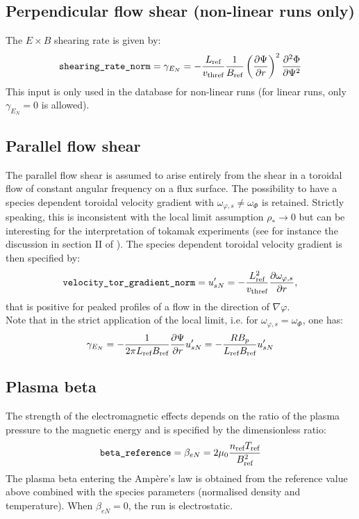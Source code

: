 \documentclass[a4paper]{report}
\begin{document}
\subsection{Perpendicular flow shear (non-linear runs only)} \label{sec:exb}
The $E\times B$ shearing rate is given by:
$$\texttt{shearing\_rate\_norm}=\gamma_{E_N}=-\frac{L_{\textrm{ref}}}{v_\textrm{thref}}\frac{1}{B_{\textrm{ref}}}\left(\frac{\partial \Psi}{\partial r}\right)^2\frac{\partial^2 \Phi}{\partial \Psi^2}$$
This input is only used in the database for non-linear runs (for linear runs, only $\gamma_{E_N}=0$ is allowed).
\subsection{Parallel flow shear} \label{sec:dvdr}
The parallel flow shear is assumed to arise entirely from the shear in a toroidal flow of constant angular frequency on a flux surface. The possibility to have a species dependent toroidal velocity gradient with $\omega_{\varphi,s}\neq \omega_\Phi$ is retained. Strictly speaking, this is inconsistent with the local limit assumption $\rho_*\rightarrow 0$ but can be interesting for the interpretation of tokamak experiments (see for instance the discussion in section II of \cite{Camenen:PoP2016}). The species dependent toroidal velocity gradient is then specified by: 
$$\texttt{velocity\_tor\_gradient\_norm}=u'_{sN}=-\frac{L_{\textrm{ref}}^2}{v_\textrm{thref}}\frac{\partial \omega_{\varphi,s}}{\partial r},$$
that is positive for peaked profiles of a flow in the direction of $\nabla \varphi$.\\
Note that in the strict application of the local limit, i.e. for $\omega_{\varphi,s}=\omega_\Phi$, one has:
$$\gamma_{E_N}= - \frac{1}{2\pi L_{\textrm{ref}} B_{\textrm{ref}}}\frac{\partial \Psi}{\partial r} u'_{sN} = - \frac{RB_p}{L_{\textrm{ref}} B_{\textrm{ref}}} u'_{sN}$$
\subsection{Plasma beta} \label{em:beta}
The strength of the electromagnetic effects depends on the ratio of the plasma pressure to the magnetic energy and is specified by the dimensionless ratio:
\begin{equation}
\texttt{beta\_reference}=\beta_{eN} = 2\mu_0 \frac{n_{\textrm{ref}} T_{\textrm{ref}}}{B_{\textrm{ref}}^2}
\end{equation}
The plasma beta entering the Amp\`ere's law is obtained from the reference value above combined with the species parameters (normalised density and temperature).
When $\beta_{eN}=0$, the run is electrostatic. 
\end{document}
